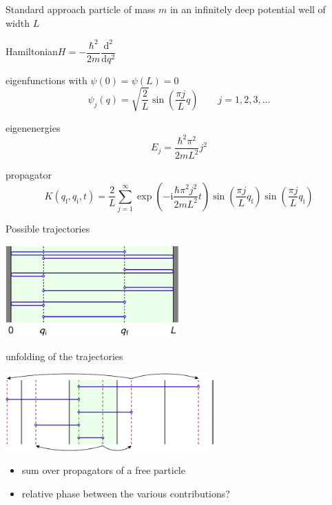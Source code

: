 \documentclass[t,dvipsnames]{beamer}
\begin{document}
\begin{frame}[t]{Standard approach}
 particle of mass $m$ in an infinitely deep potential well of width $L$

 \vspace{0.3truecm}
 Hamiltonian\quad $H = -\dfrac{\hbar^2}{2m}\dfrac{\text{d}^2}{\text{d}q^2}$

 \vspace{0.5truecm}
 eigenfunctions with $\psi(0) = \psi(L) = 0$
 \begin{displaymath}
  \psi_j(q) = \sqrt{\frac{2}{L}}\sin\!\left(\frac{\pi j}{L}q\right)\qquad
  j = 1, 2, 3, \ldots
 \end{displaymath}

 eigenenergies
 \begin{displaymath}
  E_j = \frac{\hbar^2\pi^2}{2mL^2}j^2
 \end{displaymath}

 propagator
 \begin{displaymath}
  K(q_\text{f}, q_\text{i}, t) = \frac{2}{L}\sum_{j=1}^{\infty}
    \exp\left(-\text{i}\frac{\hbar\pi^2j^2}{2mL^2}t\right)
	 \sin\!\left(\frac{\pi j}{L}q_\text{f}\right)
	 \sin\!\left(\frac{\pi j}{L}q_\text{i}\right)
 \end{displaymath}
\end{frame}

\begin{frame}[t]{Possible trajectories}

 \vspace{-0.5truecm}
 \begin{center}
  \includegraphics[width=0.5\textwidth]{traj_box}
 \end{center}

 unfolding of the trajectories
 \begin{center}
  \includegraphics[width=0.6\textwidth]{unfolding}
 \end{center}

 \begin{itemize}
  \item sum over propagators of a free particle
  \item relative phase between the various contributions?
 \end{itemize}
\end{frame}
\end{document}
